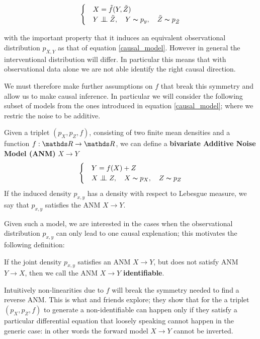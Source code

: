 \begin{equation}
    \begin{cases} 
        & X = \tilde{f}(Y, \tilde{Z}) \\
        & Y \bigCI \tilde{Z},\quad Y \thicksim p_y,\quad \tilde{Z} \thicksim p_{\tilde{Z}}  
     \end{cases}
\end{equation}

with the important property that it induces an equivalent observational distribution $p_{X, Y}$ as that of 
equation \ref{causal_model}. However in general the interventional distribution will differ. In particular 
this means that with observational data alone we are not able identify the right causal direction.

We must therefore make further assumptions on $f$ that break this symmetry and allow us to make causal inference.
In particular we will consider the following subset of models from the ones introduced in equation \ref{causal_model};
where we restric the noise to be additive.

\begin{definition} Given a triplet $(p_X, p_Z, f)$, consisting of two finite mean densities and a function
$f: \R \rightarrow \R$, we can define a \textbf{bivariate Additive Noise Model (ANM)} $X \rightarrow Y$
\[
    \begin{cases} 
        & Y = f(X) + Z \\
        & X \bigCI Z,\quad X \thicksim p_X,\quad Z \thicksim p_{Z}  
     \end{cases}  
\]
If the induced density $p_{x, y}$ has a density with respect to Lebesgue measure, we say that $p_{x, y}$
satisfies the ANM $X \rightarrow Y$.
\end{definition}

Given such a model, we are interested in the cases when the observational distribution $p_{x, y}$ can only
lead to one causal explenation; this motivates the following definition:

\begin{definition} If the joint density $p_{x, y}$ satisfies an ANM $X \rightarrow Y$, but does not satisfy
ANM $Y \rightarrow X$, then we call the ANM $X \rightarrow Y$ \textbf{identifiable}. 
\end{definition}

Intuitively non-linearities due to $f$ will break the symmetry needed to find a reverse ANM. This is what
\cite{hoyer2009nonlinear} and friends explore; they show that for the 
a triplet $(p_X, p_Z, f)$ to generate a non-identifiable can happen only if they satisfy a particular 
differential equation that loosely speaking cannot happen in the generic case: in other words the forward 
model $X \rightarrow Y$ cannot be inverted. 

